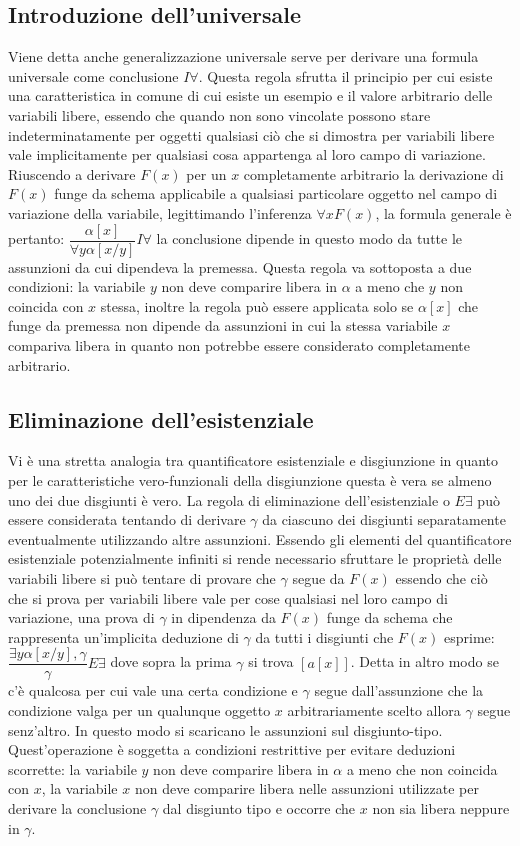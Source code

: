 \subsection{Introduzione dell'universale}
Viene detta anche generalizzazione universale serve per derivare una formula universale come conclusione $I\forall$. Questa regola sfrutta il principio per cui esiste una caratteristica in comune di cui esiste un 
esempio e il valore arbitrario delle variabili libere, essendo che quando non sono vincolate possono stare indeterminatamente per oggetti qualsiasi ci\`o che si dimostra per variabili libere vale implicitamente per 
qualsiasi cosa appartenga al loro campo di variazione. Riuscendo a derivare $F(x)$ per un $x$ completamente arbitrario la derivazione di $F(x)$ funge da schema applicabile a qualsiasi particolare oggetto nel 
campo di variazione della variabile, legittimando l'inferenza $\forall xF(x)$, la formula generale \`e pertanto: $\dfrac{\alpha[x]}{\forall y\alpha[x/y]}I\forall$ la conclusione dipende in questo modo da tutte le 
assunzioni da cui dipendeva la premessa. Questa regola va sottoposta a due condizioni: la variabile $y$ non deve comparire libera in $\alpha$ a meno che $y$ non coincida con $x$ stessa, inoltre la regola pu\`o 
essere applicata solo se $\alpha[x]$ che funge da premessa non dipende da assunzioni in cui la stessa variabile $x$ compariva libera in quanto non potrebbe essere considerato completamente arbitrario.
\subsection{Eliminazione dell'esistenziale}
Vi \`e una stretta analogia tra quantificatore esistenziale e disgiunzione in quanto per le caratteristiche vero-funzionali della disgiunzione questa \`e vera se almeno uno dei due disgiunti \`e vero. La regola di 
eliminazione dell'esistenziale o $E\exists$ pu\`o essere considerata tentando di derivare $\gamma$ da ciascuno dei disgiunti separatamente eventualmente utilizzando altre assunzioni. Essendo gli elementi 
del quantificatore esistenziale potenzialmente infiniti si rende necessario sfruttare le propriet\`a delle variabili libere si pu\`o tentare di provare che $\gamma$ segue da $F(x)$ essendo che ci\`o che si prova per 
variabili libere vale per cose qualsiasi nel loro campo di variazione, una prova di $\gamma$ in dipendenza da $F(x)$ funge da schema che rappresenta un'implicita deduzione di $\gamma$ da tutti i disgiunti che 
$F(x)$ esprime: $\dfrac{\exists y\alpha[x/y], \gamma}{\gamma}E\exists$ dove sopra la prima $\gamma$ si trova $[a[x]]$. Detta in altro modo se c'\`e qualcosa per cui vale una certa condizione e $\gamma$ 
segue dall'assunzione che la condizione valga per un qualunque oggetto $x$ arbitrariamente scelto allora $\gamma$ segue senz'altro. In questo modo si scaricano le assunzioni sul  disgiunto-tipo. 
Quest'operazione \`e soggetta a condizioni restrittive per evitare deduzioni scorrette: la variabile $y$ non deve comparire libera in $\alpha$ a meno che non coincida con $x$, la variabile $x$ non deve 
comparire libera nelle assunzioni utilizzate per derivare la conclusione $\gamma$ dal disgiunto tipo e occorre che $x$ non sia libera neppure in $\gamma$.
